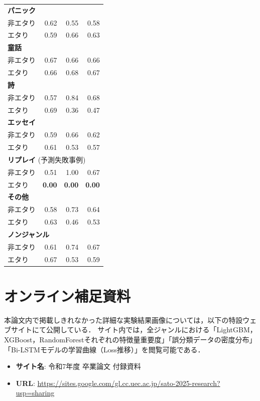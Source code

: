 \documentclass[uplatex, dvipdfmx, 11pt, a4paper, report]{jsbook}
\begin{document}
\begin{longtable}{lrrr}
\multicolumn{4}{l}{\textbf{パニック}} \\
\quad 非エタり & 0.62 & 0.55 & 0.58 \\
\quad エタり & 0.59 & 0.66 & 0.63 \\ \hline

\multicolumn{4}{l}{\textbf{童話}} \\
\quad 非エタり & 0.67 & 0.66 & 0.66 \\
\quad エタり & 0.66 & 0.68 & 0.67 \\ \hline

\multicolumn{4}{l}{\textbf{詩}} \\
\quad 非エタり & 0.57 & 0.84 & 0.68 \\
\quad エタり & 0.69 & 0.36 & 0.47 \\ \hline

\multicolumn{4}{l}{\textbf{エッセイ}} \\
\quad 非エタり & 0.59 & 0.66 & 0.62 \\
\quad エタり & 0.61 & 0.53 & 0.57 \\ \hline

\multicolumn{4}{l}{\textbf{リプレイ} (予測失敗事例)} \\
\quad 非エタり & 0.51 & 1.00 & 0.67 \\
\quad エタり & \textbf{0.00} & \textbf{0.00} & \textbf{0.00} \\ \hline

\multicolumn{4}{l}{\textbf{その他}} \\
\quad 非エタり & 0.58 & 0.73 & 0.64 \\
\quad エタり & 0.63 & 0.46 & 0.53 \\ \hline

\multicolumn{4}{l}{\textbf{ノンジャンル}} \\
\quad 非エタり & 0.61 & 0.74 & 0.67 \\
\quad エタり & 0.67 & 0.53 & 0.59 \\ \hline

\end{longtable}




\chapter{オンライン補足資料}
\label{app:online_supplement}

本論文内で掲載しきれなかった詳細な実験結果画像については，以下の特設ウェブサイトにて公開している．
サイト内では，全ジャンルにおける「LightGBM，XGBoost，RandomForestそれぞれの特徴量重要度」「誤分類データの密度分布」「Bi-LSTMモデルの学習曲線（Loss推移）」を閲覧可能である．


\begin{itemize}
    \item \textbf{サイト名}: 令和7年度 卒業論文 付録資料 
    \item \textbf{URL}: \url{https://sites.google.com/gl.cc.uec.ac.jp/sato-2025-research?usp=sharing}
\end{itemize}
\end{document}

